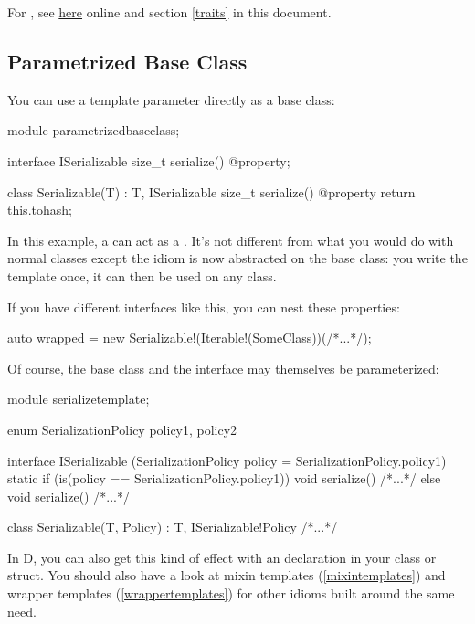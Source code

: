 For , see \href{www.dlang.org/traits.html}{here} online and section \ref{traits} in this document.

\subsection{Parametrized Base Class}

You can use a template parameter directly as a base class:

\begin{dcode}
module parametrizedbaseclass;

interface ISerializable
{
    size_t serialize() @property;
}

class Serializable(T) : T, ISerializable
{
    size_t serialize() @property 
    {
        return this.tohash; 
    }
} 
\end{dcode}

In this example, a  can act as a . It's not different from what you would do with normal classes except the idiom is now abstracted on the base class: you write the template once, it can then be used on any class.

If you have different interfaces like this, you can nest these properties:

\begin{dcode}
auto wrapped = new Serializable!(Iterable!(SomeClass))(/*...*/);
\end{dcode}

Of course, the base class and the interface may themselves be parameterized:

\begin{dcode}
module serializetemplate;

enum SerializationPolicy { policy1, policy2 }

interface ISerializable 
(SerializationPolicy policy = SerializationPolicy.policy1)
{
    static if (is(policy == SerializationPolicy.policy1))
        void serialize() { /*...*/ }
    else
        void serialize() { /*...*/ }
}

class Serializable(T, Policy) : T, ISerializable!Policy
{
    /*...*/
} 
\end{dcode}

In D, you can also get this kind of effect with an  declaration in your class or struct. You should also have a look at mixin templates (\ref{mixintemplates}) and wrapper templates (\ref{wrappertemplates}) for other idioms built around the same need. 

